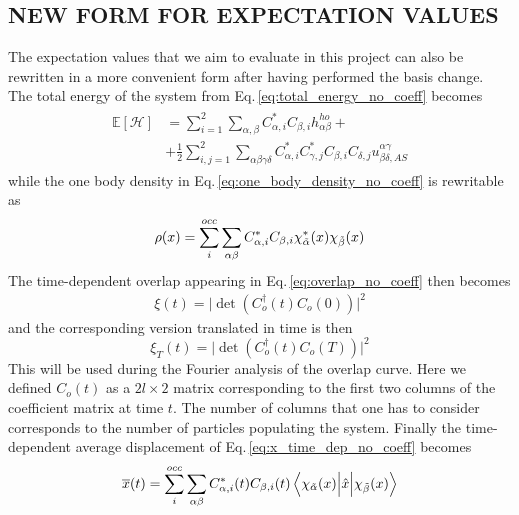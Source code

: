 \subsection{NEW FORM FOR EXPECTATION VALUES}
The expectation values that we aim to evaluate in this project can also be rewritten in a more convenient form after having performed the basis change. The total energy of the system from Eq.\,\ref{eq:total_energy_no_coeff} becomes
\begin{align}
\begin{split}
    \mathbb{E}[\mathcal{H}] &= \sum_{i=1}^2 \sum_{\alpha,\beta} C_{\alpha,i}^* C_{\beta,i} h_{\alpha\beta}^{ho} + \\
    & + \frac{1}{2} \sum_{i,j=1}^2 \sum_{\alpha\beta\gamma\delta} C_{\alpha,i}^* C_{\gamma,j}^* C_{\beta,i} C_{\delta,j}  u^{\alpha\gamma}_{\beta\delta,AS}
\end{split}
\label{eq:total_energy_coeff}
\end{align}
while the one body density in Eq.\,\ref{eq:one_body_density_no_coeff} is rewritable as
\begin{align}
\begin{split}
    \rho(x) = \sum_i^{occ} \sum_{\alpha\beta} C_{\alpha,i}^* C_{\beta,i} \chi_{\Tilde{\alpha}}^*(x) \chi_{\Tilde{\beta}}(x)
\end{split}
\label{eq:one_body_density_coeff}
\end{align}
The time-dependent overlap appearing in Eq.\,\ref{eq:overlap_no_coeff} then becomes
\begin{align}
    \xi(t) = \big\vert \det \left( C_o^{\dag}(t) C_o(0) \right) \big\vert^2 
    \label{eq:overlap_coeff}
\end{align}
and the corresponding version translated in time is then
\begin{equation}
    \xi_T(t) = \big\vert \det \left( C_o^{\dag}(t) C_o(T) \right) \big\vert^2
    \label{eq:overlap_T_coeff}
\end{equation}
This will be used during the Fourier analysis of the overlap curve. Here we defined $C_o(t)$ as a $2l\times2$ matrix corresponding to the first two columns of the coefficient matrix at time $t$. The number of columns that one has to consider corresponds to the number of particles populating the system. Finally the time-dependent average displacement of Eq.\,\ref{eq:x_time_dep_no_coeff} becomes
\begin{align}
    \overline{x}(t) = \sum_i^{occ} \sum_{\alpha\beta} C_{\alpha,i}^*(t) C_{\beta,i} (t) \bracketOP{\chi_{\Tilde{\alpha}}(x)}{\chi_{\Tilde{\beta}}(x)}{\hat{x}} 
    \label{eq:x_time_dependent_coeff}
\end{align}



